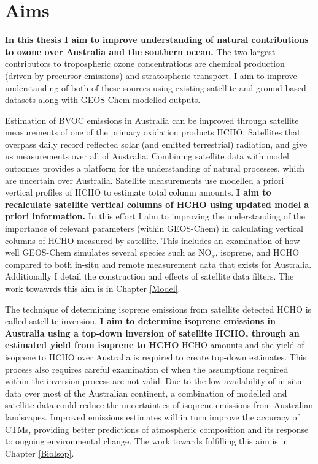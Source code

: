 \section{Aims}
\label{LR:Aims}

  \textbf{In this thesis I aim to improve understanding of natural contributions to ozone over Australia and the southern ocean.}
  The two largest contributors to tropospheric ozone concentrations are chemical production (driven by precursor emissions) and stratospheric transport.
  I aim to improve understanding of both of these sources using existing satellite and ground-based datasets along with GEOS-Chem modelled outputs.
  
  Estimation of BVOC emissions in Australia can be improved through satellite measurements of one of the primary oxidation products HCHO.
  Satellites that overpass daily record reflected solar (and emitted terrestrial) radiation, and give us measurements over all of Australia.
  Combining satellite data with model outcomes provides a platform for the understanding of natural processes, which are uncertain over Australia.
  Satellite measurements use modelled a priori vertical profiles of HCHO to estimate total column amounts.
  \textbf{I aim to recalculate satellite vertical columns of HCHO using updated model a priori information.}
  In this effort I aim to improving the understanding of the importance of relevant parameters (within GEOS-Chem) in calculating vertical columns of HCHO measured by satellite.
  This includes an examination of how well GEOS-Chem simulates several species such as NO$_x$, isoprene, and HCHO compared to both in-situ and remote measurement data that exists for Australia.
  Additionally I detail the construction and effects of satellite data filters.
  The work towawrds this aim is in Chapter \ref{Model}.
  
  The technique of determining isoprene emissions from satellite detected HCHO is called satellite inversion.
  \textbf{I aim to determine isoprene emissions in Australia using a top-down inversion of satellite HCHO, through an estimated yield from isoprene to HCHO}
  HCHO amounts and the yield of isoprene to HCHO over Australia is required to create top-down estimates.
  This process also requires careful examination of when the assumptions required within the inversion process are not valid.
  Due to the low availability of in-situ data over most of the Australian continent, a combination of modelled and satellite data could reduce the uncertainties of isoprene emissions from Australian landscapes.
  Improved emissions estimates will in turn improve the accuracy of CTMs, providing better predictions of atmospheric composition and its response to ongoing environmental change.
  The work towards fulfilling this aim is in Chapter \ref{BioIsop}.
  
